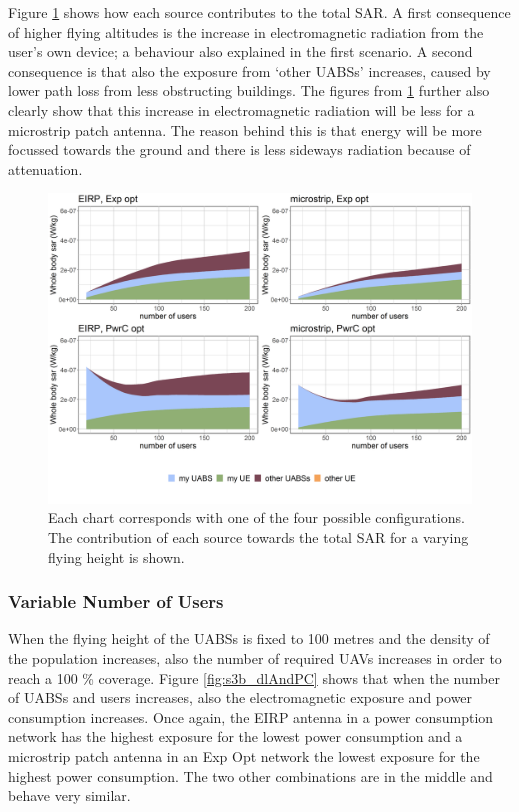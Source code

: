 \documentclass[twocolumn]{phdsymp} %
\begin{document}
Figure \ref{fig:s3a_fourSourcesMatrix} shows how each source contributes to the total \gls{SAR}.
A first consequence of higher flying altitudes is the increase in electromagnetic radiation from the user's own device; a behaviour also explained in the first scenario.
A second  consequence is that also 
 the exposure from `other \gls{UABS}s' increases, caused by lower path loss from less obstructing buildings.
The figures from \ref{fig:s3a_fourSourcesMatrix} further also clearly show that this increase 
in electromagnetic radiation will be less for a microstrip patch antenna. The reason behind this is that energy 
will be more focussed towards the ground and there is less sideways radiation because of attenuation.

\begin{figure}[h!]
  \includegraphics[width=\linewidth]{../results/s3/fhFourSources.png}
  \caption{Each chart corresponds with one of the four possible configurations. The contribution of each source towards the total 
  \gls{SAR} for a varying flying height is shown.}
  \label{fig:s3a_fourSourcesMatrix}
\end{figure}

\subsubsection{Variable Number of Users}
When the flying height of the \gls{UABS}s is fixed to 100 metres and the density of the population increases, also 
the number of required \gls{UAV}s increases in order to reach a 100 \% coverage.
Figure \ref{fig:s3b_dlAndPC} shows that when the number of \gls{UABS}s and users increases, 
also the electromagnetic exposure and power consumption increases.
Once again, the EIRP antenna in a power consumption network has the highest exposure for the lowest power consumption
and a microstrip patch antenna in an \gls{Exp Opt} network the lowest exposure for the highest power consumption.
The two other combinations are in the middle and behave very similar.
\end{document}
